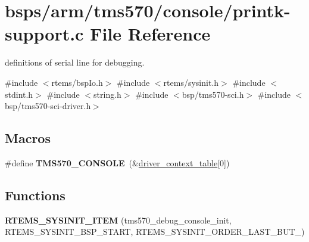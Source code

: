 \hypertarget{printk-support_8c}{}\section{bsps/arm/tms570/console/printk-\/support.c File Reference}
\label{printk-support_8c}


definitions of serial line for debugging.  


{\ttfamily \#include $<$rtems/bsp\+Io.\+h$>$}\newline
{\ttfamily \#include $<$rtems/sysinit.\+h$>$}\newline
{\ttfamily \#include $<$stdint.\+h$>$}\newline
{\ttfamily \#include $<$string.\+h$>$}\newline
{\ttfamily \#include $<$bsp/tms570-\/sci.\+h$>$}\newline
{\ttfamily \#include $<$bsp/tms570-\/sci-\/driver.\+h$>$}\newline
\subsection*{Macros}
\begin{DoxyCompactItemize}
\item 
\mbox{\label{printk-support_8c_a1badb5d144118f326d6c8724fc7cd4ac}} 
\#define {\bfseries T\+M\+S570\+\_\+\+C\+O\+N\+S\+O\+LE}~(\&\mbox{\hyperlink{tms570-sci-driver_8h_a6162f56b8d4e448ce7f72275b7bdc039}{driver\+\_\+context\+\_\+table}}\mbox{[}0\mbox{]})
\end{DoxyCompactItemize}
\subsection*{Functions}
\begin{DoxyCompactItemize}
\item 
\mbox{\label{printk-support_8c_a075acbe07ac40a370eb556c3ea1825a7}} 
{\bfseries R\+T\+E\+M\+S\+\_\+\+S\+Y\+S\+I\+N\+I\+T\+\_\+\+I\+T\+EM} (tms570\+\_\+debug\+\_\+console\+\_\+init, R\+T\+E\+M\+S\+\_\+\+S\+Y\+S\+I\+N\+I\+T\+\_\+\+B\+S\+P\+\_\+\+S\+T\+A\+RT, R\+T\+E\+M\+S\+\_\+\+S\+Y\+S\+I\+N\+I\+T\+\_\+\+O\+R\+D\+E\+R\+\_\+\+L\+A\+S\+T\+\_\+\+B\+U\+T\+\_)
\end{DoxyCompactItemize}
